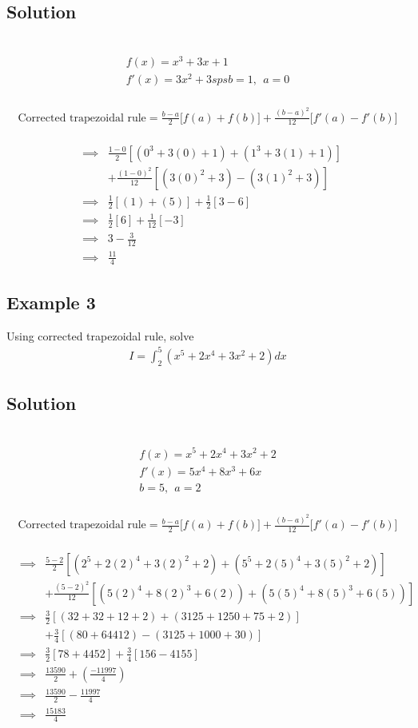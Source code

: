 \documentclass[12pt]{report}
\newcommand{\sps}{\\[0.2cm]}
\newcommand{\spn}[1]{\\[#1cm]}
\newcommand{\sprime}{'}
\begin{document}
	\subsection*{Solution}
	{~}\\[-2.1cm]
	\begin{gather*}
		f(x) = x^3 +3x + 1\sps
		f\sprime(x) = 3x^2 + 3sps
		b=1,~~ a=0
	\end{gather*}
	{~}\\[-2.1cm]
	\begin{gather*}
		\text{Corrected trapezoidal rule} = \frac{b-a}{2}\Big[f(a) + f(b)\Big] + \frac{(b-a)^2}{12}\Big[f\sprime(a)-f\sprime(b)\Big]
	\end{gather*}
	{~}\\[-1.5cm]
	\begin{eqnarray*}
		&\implies&\frac{1-0}{2}\left[ (0^3 + 3(0) + 1) + (1^3 + 3(1) + 1) \right]\sps
		&& +\frac{(1-0)^2}{12}\left[ (3(0)^2 + 3) - (3(1)^2 + 3) \right]\spn{0.4}
		&\implies&\frac{1}{2}\left[(1) + (5)\right]+ \frac{1}{2}\left[3-6\right]\spn{0.4}
		&\implies&\frac{1}{2}\left[6\right]+ \frac{1}{12}\left[-3\right]\spn{0.4}
		&\implies& 3 - \frac{3}{12}\spn{0.4}
		&\implies&\frac{11}{4}
	\end{eqnarray*}
	
	
	
	\subsection{Example 3}
	Using corrected trapezoidal rule, solve
	\begin{eqnarray*}
		I = \int_2^5\left(x^5 + 2x^4 + 3x^2 + 2\right)dx
	\end{eqnarray*}
	
	\subsection*{Solution}
	{~}\\[-2.1cm]
	\begin{gather*}
		f(x) = x^5 + 2x^4 + 3x^2 + 2\sps
		f\sprime(x) = 5x^4 + 8x^3 + 6x \sps
		b=5,~~ a=2
	\end{gather*}
	{~}\\[-2.1cm]
	\begin{gather*}
		\text{Corrected trapezoidal rule} = \frac{b-a}{2}\Big[f(a) + f(b)\Big] + \frac{(b-a)^2}{12}\Big[f\sprime(a)-f\sprime(b)\Big]
	\end{gather*}
	{~}\\[-1.5cm]
	\begin{eqnarray*}
		&\implies&\frac{5-2}{2}\left[ (2^5 + 2(2)^4 + 3(2)^2 + 2) + (5^5 + 2(5)^4 + 3(5)^2 + 2) \right]\sps
		&& +\frac{(5-2)^2}{12}\left[ (5(2)^4 + 8(2)^3 + 6(2)) + (5(5)^4 + 8(5)^3 + 6(5))  \right]\spn{0.4}
		&\implies& \frac{3}{2}[(32+32+12+2) + (3125+1250+75+2)] \sps
		&& +\frac{3}{4}\left[ (80+64412) - (3125+1000+30) \right]   \spn{0.4}
		&\implies&  \frac{3}{2}[78+4452] + \frac{3}{4}[156 - 4155] \spn{0.4}
		&\implies& \frac{13590}{2} + \left(\frac{-11997}{4}\right)\spn{0.4}
		&\implies&\frac{13590}{2} - \frac{11997}{4}\spn{0.4}
		&\implies& \frac{15183}{4} 
	\end{eqnarray*}
	
\end{document}
